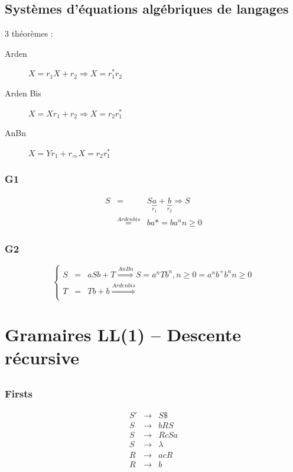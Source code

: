 \documentclass[12pt,a4paper,openany]{book}
\begin{document}
\section{Systèmes d'équations algébriques de langages}
\begin{remarque}
	3 théorèmes :
	\begin{description}
		\item[Arden] $X = r_1X + r_2 \Rightarrow X = r_1^*r_2$
		\item[Arden Bis] $X = Xr_{1}+r_2 \Rightarrow X = r_2r_1^*$
		\item[AnBn] $X = Yr_1+r_ \Rightarrow X = r_2r_1^*$
	\end{description}
\end{remarque}

\subsection{G1}
\begin{eqnarray*}
	S &=&  S\underbrace{a}_{r_1} + \underbrace{b}_{r_2} \Rightarrow S\\
	&\stackrel{Ardenbis}{=}&  ba* = ba^n n\geq 0
\end{eqnarray*}

\subsection{G2}
\begin{displaymath}
	\left\{
	\begin{array}{ccc}
		S &=&  aSb + T \stackrel{AnBn}{\Longrightarrow} S = a^nTb^n, n \geq 0 = a^nb^+b^n n\geq 0\\
		T &=& Tb+b \stackrel{Ardenbis}{\Longrightarrow} \\
	\end{array}
	\right.
\end{displaymath}

\chapter{Gramaires LL(1) -- Descente récursive}
\section{}
\subsection{Firsts}
\begin{eqnarray}
	S' &\rightarrow& S\$\\
	S  &\rightarrow& bRS\\
	S  &\rightarrow& RcSa\\
	S  &\rightarrow& \lambda\\
	R  &\rightarrow& acR\\
	R  &\rightarrow& b\\
\end{eqnarray}
\end{document}
